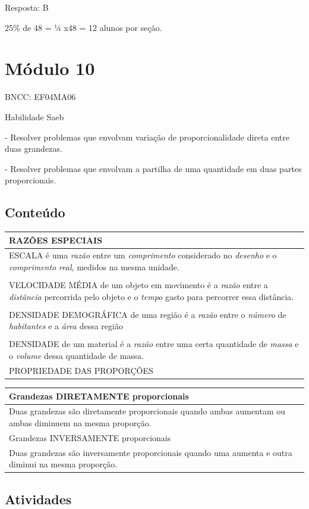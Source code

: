 Resposta: B

25\% de 48 = ¼ x48 = 12 alunos por seção.

\section{Módulo 10}\label{muxf3dulo-10}

BNCC: EF04MA06

Habilidade Saeb

- Resolver problemas que envolvam variação de proporcionalidade direta
entre duas grandezas.

- Resolver problemas que envolvam a partilha de uma quantidade em duas
partes proporcionais.

\subsection{Conteúdo}\label{conteuxfado-9}

\begin{longtable}[]{@{}l@{}}
\toprule
RAZÕES ESPECIAIS\tabularnewline
\midrule
\endhead
ESCALA é uma \emph{razão} entre um \emph{comprimento} considerado no
\emph{desenho} e o \emph{comprimento} \emph{real}, medidos na mesma
unidade.\tabularnewline
\tabularnewline
VELOCIDADE MÉDIA de um objeto em movimento é a \emph{razão} entre a
\emph{distância} percorrida pelo objeto e o \emph{tempo} gasto para
percorrer essa distância.\tabularnewline
\tabularnewline
DENSIDADE DEMOGRÁFICA de uma região é a \emph{razão} entre o
\emph{número} de \emph{habitantes} e a \emph{área} dessa
região\tabularnewline
\tabularnewline
DENSIDADE de um material é a \emph{razão} entre uma certa quantidade de
\emph{massa} e o \emph{volume} dessa quantidade de massa.\tabularnewline
PROPRIEDADE DAS PROPORÇÕES\tabularnewline
\bottomrule
\end{longtable}

\begin{longtable}[]{@{}l@{}}
\toprule
Grandezas DIRETAMENTE proporcionais\tabularnewline
\midrule
\endhead
Duas grandezas são diretamente proporcionais quando ambas aumentam ou
ambas diminuem na mesma proporção.\tabularnewline
Grandezas INVERSAMENTE proporcionais\tabularnewline
Duas grandezas são inversamente proporcionais quando uma aumenta e outra
diminui na mesma proporção.\tabularnewline
\bottomrule
\end{longtable}

\subsection{Atividades}\label{atividades-9}

